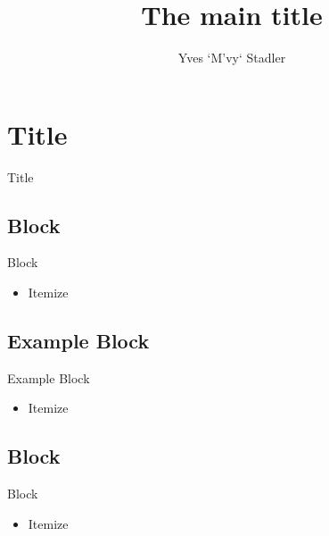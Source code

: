 \documentclass[french, 10pt]{beamer}
\title{The main title}
\author{Yves `M'vy` Stadler}
\begin{document}
\begin{frame}
\titlepage
\end{frame}

\def\sectitle{Title}
\section{\sectitle}
\begin{frame}{\sectitle}
    \def\subsectitle{Block}
    \subsection{\subsectitle}
    \begin{block}{\subsectitle}
        \begin{itemize}
            \item Itemize
        \end{itemize}
    \end{block}
    \def\subsectitle{Example Block}
    \subsection{\subsectitle}
    \begin{exampleblock}{\subsectitle}
        \begin{itemize}
            \item Itemize
        \end{itemize}
    \end{exampleblock}
    \def\subsectitle{Block}
    \subsection{\subsectitle}
    \begin{alertblock}{\subsectitle}
        \begin{itemize}
            \item Itemize
        \end{itemize}
    \end{alertblock}
\end{frame}
\end{document}
